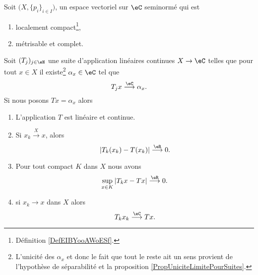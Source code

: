 \begin{corollary}   \label{CorPGwLluz}
	Soit \( \big( X, \{ p_i \}_{i\in I} \big)\), un espace vectoriel sur \( \eC\) seminormé qui est
	\begin{enumerate}
		\item
		      localement compact\footnote{Définition \ref{DefEIBYooAWoESf}.},
		\item
		      métrisable et complet.
	\end{enumerate}
	Soit \( (T_j)_{j\in \eN}\) une suite d'application linéaires continues \( X\to \eC\) telles que pour tout \( x\in X\) il existe\footnote{L'unicité des \( \alpha_x\) et donc le fait que tout le reste ait un sens provient de l'hypothèse de séparabilité et la proposition \ref{PropUniciteLimitePourSuites}.} \( \alpha_x\in \eC\) tel que
	\begin{equation}
		T_jx\stackrel{\eC}{\longrightarrow}\alpha_x.
	\end{equation}
	Si nous posons \( Tx=\alpha_x\) alors
	\begin{enumerate}
		\item   \label{ItemAEOtOMLi}
		      L'application \( T\) est linéaire et continue.
		\item       \label{ITEMooEVIXooBpaWOc}
		      Si \( x_k\stackrel{X}{\longrightarrow}x\), alors
		      \begin{equation}
			      | T_k(x_k)-T(x_k) |\stackrel{\eR}{\longrightarrow}0.
		      \end{equation}
		\item       \label{ITEMooJYOVooPIkHBo}
		      Pour tout compact \( K\) dans \( X\) nous avons
		      \begin{equation}
			      \sup_{x\in K}|T_kx-Tx|\stackrel{\eR}{\longrightarrow}0.
		      \end{equation}
		\item   \label{ItemAEOtOMLiii}
		      si \( x_k\to x\) dans \( X\) alors
		      \begin{equation}
			      T_kx_k\stackrel{\eC}{\longrightarrow} Tx.
		      \end{equation}
	\end{enumerate}
\end{corollary}


